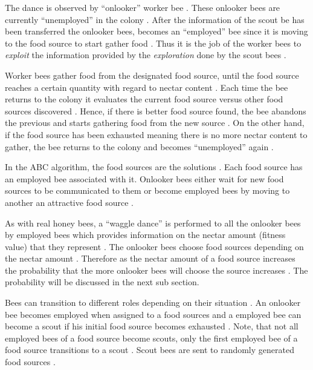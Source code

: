 The dance is observed by ``onlooker'' worker bee \cite{ABCCompareStudy,ABCImageEnhancement}. These onlooker bees are currently ``unemployed'' in the colony \cite{ABCCompareStudy,ABCImageEnhancement}. After the information of the scout be has been transferred the onlooker bees, becomes an ``employed'' bee since it is moving to the food source to start gather food \cite{ABCCompareStudy,ABCImageEnhancement}. Thus it is the job of the worker bees to \emph{exploit} the information provided by the \emph{exploration} done by the scout bees \cite{ABCCompareStudy,ABCNumericalOptimization}. 

Worker bees gather food from the designated food source, until the food source reaches a certain quantity with regard to nectar content \cite{ABCCompareStudy,ABCNumericalOptimization}. Each time the bee returns to the colony it evaluates the current food source versus other food sources discovered \cite{ABCCompareStudy,ABCNumericalOptimization}. Hence, if there is better food source found, the bee abandons the previous and starts gathering food from the new source \cite{ABCCompareStudy,ABCNumericalOptimization}. On the other hand, if the food source has been exhausted meaning there is no more nectar content to gather, the bee returns to the colony and becomes ``unemployed'' again \cite{ABCCompareStudy,ABCNumericalOptimization}.

In the ABC algorithm, the food sources are the solutions \cite{ABCCompareStudy,ABCNumericalOptimization}. Each food source has an employed bee associated with it. Onlooker bees either wait for new food sources to be communicated to them or become employed bees by moving to another an attractive food source \cite{ABCCompareStudy,ABCNumericalOptimization}. 

As with real honey bees, a ``waggle dance'' is performed to all the onlooker bees by employed bees which provides information on the nectar amount (fitness value) that they represent \cite{ABCReconfigDistro,ABCCompareStudy,ABCImageEnhancement}. The onlooker bees choose food sources depending on the nectar amount \cite{ABCReconfigDistro,ABCCompareStudy,ABCImageEnhancement}. Therefore as the nectar amount of a food source increases the probability that the more onlooker bees will choose the source increases \cite{ABCReconfigDistro,ABCCompareStudy,ABCImageEnhancement}. The probability will be discussed in the next sub section.

Bees can transition to different roles depending on their situation \cite{ABCCompareStudy,ABCNumericalOptimization}. An onlooker bee becomes employed when assigned to a food sources and a employed bee can become a scout if his initial food source becomes exhausted \cite{ABCImageEnhancement,ABCCompareStudy,ABCReconfigDistro}. Note, that not all employed bees of a food source become scouts, only the first employed bee of a food source transitions to a scout \cite{ABCImageEnhancement,ABCCompareStudy,ABCReconfigDistro}. Scout bees are sent to randomly generated food sources \cite{ABCImageEnhancement,ABCCompareStudy,ABCReconfigDistro}. 

